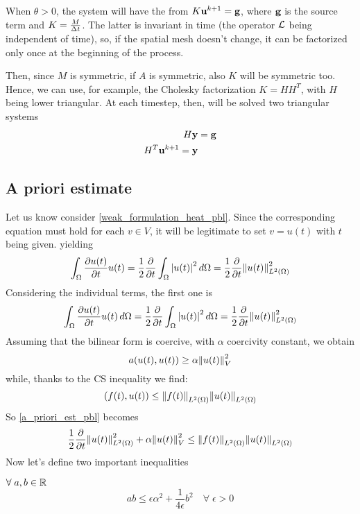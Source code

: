 When \(\theta > 0\), the system will have the from \(K\textbf{u}^{k+1} = \textbf{g}\), where \(\textbf{g}\) is the source term and \(K = \frac{M}{\Delta t}\). The latter is invariant in time (the operator \(\mathcal{L}\) being independent of time), so, if the spatial mesh doesn't change, it can be factorized only once at the beginning of the process. 

Then, since \(M\) is symmetric, if \(A\) is symmetric, also \(K\) will be symmetric too. Hence, we can use, for example, the Cholesky factorization \(K = HH^T\), with \(H\) being lower triangular. At each timestep, then, will be solved two triangular systems 
\begin{align*}
    H\textbf{y} &= \textbf{g} \\
    H^T \textbf{u}^{k+1} = \textbf{y}
\end{align*}
\subsection{A priori estimate}
Let us know consider \eqref{weak_formulation_heat_pbl}. Since the corresponding equation must hold for each \(v \in V\), it will be legitimate to set \(v = u(t)\) with \(t\) being given. yielding 
\begin{equation}
    \int_\Omega \partialderivative{u(t)}{t} u(t) = \frac{1}{2}\partialderivative{\null}{t} \int_\Omega \abs{u(t)}^2 \, d\Omega = \frac{1}{2} \partialderivative{\null}{t} \ltwonorm{u(t)}^2
    \label{a_priori_est_pbl}
\end{equation}
Considering the individual terms, the first one is 
\begin{equation}
    \int_\Omega \partialderivative{u(t)}{t} u(t) \, d\Omega = \onehalf \partialderivative{\null}{t} \int_\Omega \abs{u(t)}^2 \, d\Omega = \onehalf \partialderivative{\null}{t} \ltwonorm{u(t)}^2
    \label{first_term_est_pbl}
\end{equation}
Assuming that the bilinear form is coercive, with \(\alpha\) coercivity constant, we obtain 
\[
    a(u(t), u(t)) \geq \alpha \norm{u(t)}^2_V
\]
while, thanks to the CS inequality we find:
\begin{equation}
    (f(t), u(t)) \leq \norm{f(t)}_{L^2(\Omega)}\norm{u(t)}_{L^2(\Omega)}
    \label{CS_inequality_pbl}
\end{equation}
So \eqref{a_priori_est_pbl} becomes 
\[
    \frac{1}{2} \partialderivative{\null}{t} \ltwonorm{u(t)}^2 + \alpha \norm{u(t)}_V^2 \leq \ltwonorm{f(t)}\ltwonorm{u(t)}
\] 
Now let's define two important inequalities 
\begin{definition}
    \(\forall \; a, b \in \mathbb{R}\)
    \begin{equation}
        ab \leq \epsilon\alpha^2 + \frac{1}{4\epsilon} b^2 \quad \forall \; \epsilon >0 \label{young_inequality_pbl}
    \end{equation}
\end{definition}
